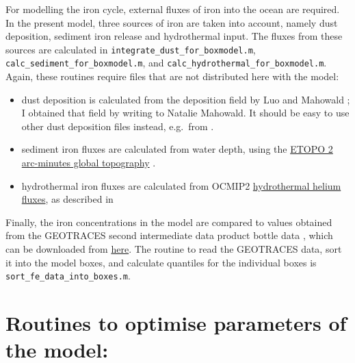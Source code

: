 \documentclass[a4paper,titlepage=false]{scrartcl}
\begin{document}
For modelling the iron cycle, external fluxes of iron into the ocean
are required. In the present model, three sources of iron are taken
into account, namely dust deposition, sediment iron release and
hydrothermal input. The fluxes from these sources are calculated in
\verb+integrate_dust_for_boxmodel.m+,
\verb+calc_sediment_for_boxmodel.m+, and
\verb+calc_hydrothermal_for_boxmodel.m+. Again, these routines require
files that are not distributed here with the model:
\begin{itemize}
\item dust deposition is calculated from the deposition field by Luo
  and Mahowald \citep{Mahowald03}; I obtained that field by writing to Natalie
  Mahowald. It should be easy to use other dust deposition files
  instead, e.g.\ from \citet{Albani16}.
\item sediment iron fluxes are calculated from water depth, using the
  \href{https://www.ngdc.noaa.gov/mgg/global/relief/ETOPO2/ETOPO2v2-2006/ETOPO2v2g/netCDF/ETOPO2v2g_f4_netCDF.zip}{ETOPO 2 arc-minutes global topography} \citep{ETOPO2}.
\item hydrothermal iron fluxes are calculated from OCMIP2 \href{http://ocmip5.ipsl.jussieu.fr/OCMIP/phase2/simulations/Helium/boundcond/src_helium.nc}{hydrothermal helium
  fluxes}, as described in \citet{Tagliabue10}
\end{itemize}

Finally, the iron concentrations in the model are compared to values
obtained from the GEOTRACES second intermediate data product bottle
data \citep{Schlitzer18}, which can be downloaded from
\href{https://www.bodc.ac.uk/data/download/asset/2135/generic/}{here}. The
routine to read the GEOTRACES data, sort it into the model boxes, and
calculate quantiles for the individual boxes is
\verb+sort_fe_data_into_boxes.m+.

\section{Routines to optimise parameters of the model:}



\end{document}
